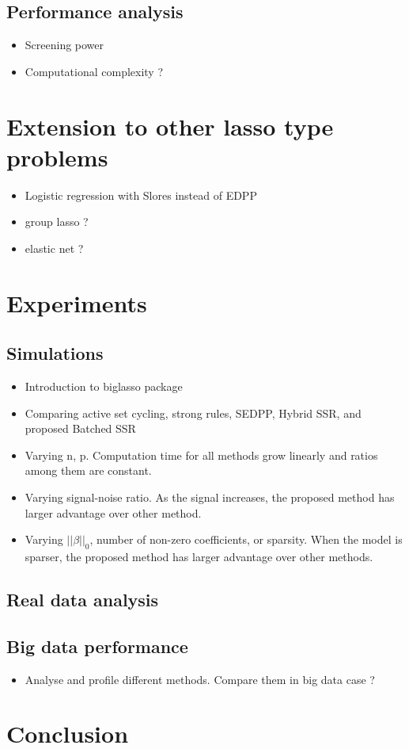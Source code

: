 \documentclass{article}
\begin{document}
\subsection{Performance analysis}
\begin{itemize}
    \item Screening power
    \item Computational complexity ?
\end{itemize}

\section{Extension to other lasso type problems}
\label{sec:4}

\begin{itemize}
    \item Logistic regression with Slores instead of EDPP
    \item group lasso ?
    \item elastic net ?
\end{itemize}

\section{Experiments}
\label{sec:5}

\subsection{Simulations}
\label{sec:sim}
\begin{itemize}
    \item Introduction to biglasso package
\end{itemize}
\begin{itemize}
    \item Comparing active set cycling, strong rules, SEDPP, Hybrid SSR, and proposed Batched SSR
    \item Varying n, p. Computation time for all methods grow linearly and ratios among them are constant.
    \item Varying signal-noise ratio. As the signal increases, the proposed method has larger advantage over other method.
    \item Varying $||\beta||_0$, number of non-zero coefficients, or sparsity. When the model is sparser, the proposed method has larger advantage over other methods.
\end{itemize}

\subsection{Real data analysis}
\label{sec:real-data}

\subsection{Big data performance}

\begin{itemize}
    \item Analyse and profile different methods. Compare them in big data case ?
\end{itemize}

\section{Conclusion}
\label{sec:6}




\end{document}
